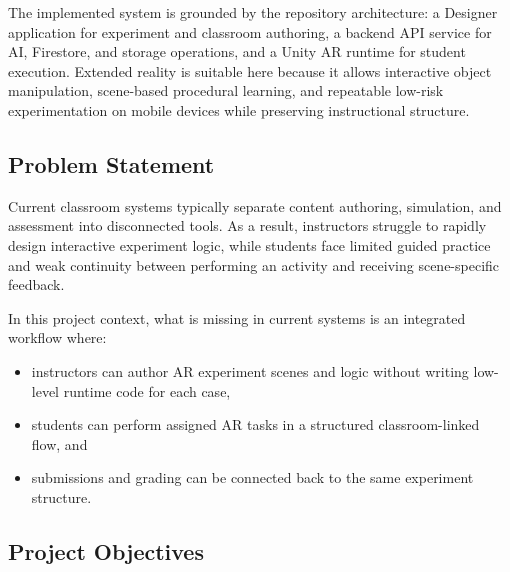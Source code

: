 \documentclass[12pt,a4paper]{article}
\begin{document}
The implemented system is grounded by the repository architecture: a Designer application
for experiment and classroom authoring, a backend API service for AI, Firestore, and
storage operations, and a Unity AR runtime for student execution. Extended reality is
suitable here because it allows interactive object manipulation, scene-based procedural
learning, and repeatable low-risk experimentation on mobile devices while preserving
instructional structure.

\subsection{Problem Statement}

Current classroom systems typically separate content authoring, simulation, and assessment
into disconnected tools. As a result, instructors struggle to rapidly design interactive
experiment logic, while students face limited guided practice and weak continuity between
performing an activity and receiving scene-specific feedback.

In this project context, what is missing in current systems is an integrated workflow where:
\begin{itemize}[leftmargin=1.4cm]
  \item instructors can author AR experiment scenes and logic without writing low-level
        runtime code for each case,
  \item students can perform assigned AR tasks in a structured classroom-linked flow, and
  \item submissions and grading can be connected back to the same experiment structure.
\end{itemize}

\subsection{Project Objectives}
\end{document}
